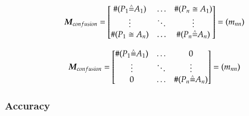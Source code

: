 \documentclass[10pt]{article}
\newcommand{\hatset}[1]{\accentset{\wedge}{#1}}
\newif\ifen
\newif\ifde
\newcommand{\en}[1]{\ifen#1\fi}
\newcommand{\de}[1]{\ifde#1\fi}
\begin{document}
		 	\de{Zum Schluß besitzt die Confusion Matrix folgenden Aufbau (Gleichung \ref{eq:equation_confusion_matrix}), wobei die Anzahl von Elementen in der Klasse \(P_{i}\) vorhergesagt wurde, obwohl (\(\cong\)) es hätte Klasse \(A_{j}\) sein müssen. Alle Werte auf der Diagonalen wurden richtig vorhergesehen. Wenn das Modell eine Modellgenauigkeit von 100\% aufweist, dann wurden alle Klassen richtig vorhergesagt und alle Elemente neben der Hauptdiagonalen sind 0 (equation \ref{eq:equation_confusion_matrix_correct}).}
			\en{Finally, the confusion matrix has the following structure (Equation \ref{eq:equation_confusion_matrix}), where the number of elements in the class \(P_{i}\) was predicted (P - predicted) although (\(\cong\)) it should have been class \(A_{j}\) (A - actual). All values on the diagonal were correctly predicted (\(\hatset{=}\)). If the model has a model accuracy of 100\%, then all classes were predicted correctly and all elements beside the main diagonal are 0 (Equation \ref{eq:equation_confusion_matrix_correct}).}

			\begin{equation}
				\boldsymbol{M}_{confusion} = \begin{bmatrix}
					\#(P_{1}\hatset{=} A_{1}) & \dots & \#(P_{n}\cong A_{1}) \\
					\vdots & \ddots & \vdots \\
					\#(P_{1}\cong A_{n}) & \dots & \#(P_{n}\hatset{=} A_{n})
				\end{bmatrix} = (m_{nn})
				\label{eq:equation_confusion_matrix}
			\end{equation}

			\begin{equation}
				\boldsymbol{M}_{confusion} = \begin{bmatrix}
					\#(P_{1}\hatset{=} A_{1}) & \dots & 0 \\
					\vdots & \ddots & \vdots \\
					0 & \dots & \#(P_{n}\hatset{=} A_{n})
				\end{bmatrix} = (m_{nn})
				\label{eq:equation_confusion_matrix_correct}
			\end{equation}

		\subsubsection{Accuracy}
			\de{Die \textbf{Top-1-Genauigkeit} ist wahrscheinlich die wichtigste Genauigkeit. Sie sagt sagt aus, zu wieviel Prozent die jeweils beste Aussage des Modells auf die Daten des Validierungssets mit der erwarteten Klasse übereinstimmt.}
			\en{\textbf{Top-1 accuracy} is probably the most important accuracy. It tells one the percentage of the model's best prediction of the data in the validation set that matches the expected class.}
\end{document}
